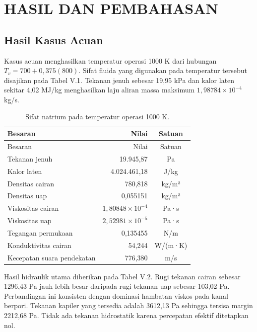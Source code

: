 \documentclass[
  12pt,a4paper,oneside]{report}
\begin{document}
\hypertarget{hasil-dan-pembahasan}{%
\chapter{HASIL DAN PEMBAHASAN}\label{hasil-dan-pembahasan}}

\hypertarget{hasil-kasus-acuan}{%
\section{Hasil Kasus Acuan}\label{hasil-kasus-acuan}}

Kasus acuan menghasilkan temperatur operasi 1000 K dari hubungan
\(T_v=700+0{,}375(800)\). Sifat fluida yang digunakan pada temperatur
tersebut disajikan pada Tabel V.1. Tekanan jenuh sebesar 19,95 kPa dan
kalor laten sekitar 4,02 MJ/kg menghasilkan laju aliran massa maksimum
\(1{,}98784\times10^{-4}\) kg/s.

\begin{longtable}[]{@{}lrc@{}}
\caption{Sifat natrium pada temperatur operasi 1000 K.}\tabularnewline
\toprule
Besaran & Nilai & Satuan \\
\midrule
\endfirsthead
\toprule
Besaran & Nilai & Satuan \\
\midrule
\endhead
Tekanan jenuh & 19.945,87 & Pa \\
Kalor laten & 4.024.461,18 & J/kg \\
Densitas cairan & 780,818 & kg/m³ \\
Densitas uap & 0,055151 & kg/m³ \\
Viskositas cairan & \(1{,}80848\times10^{-4}\) & Pa·s \\
Viskositas uap & \(2{,}52981\times10^{-5}\) & Pa·s \\
Tegangan permukaan & 0,135455 & N/m \\
Konduktivitas cairan & 54,244 & W/(m·K) \\
Kecepatan suara pendekatan & 776,380 & m/s \\
\bottomrule
\end{longtable}

Hasil hidraulik utama diberikan pada Tabel V.2. Rugi tekanan cairan
sebesar 1296,43 Pa jauh lebih besar daripada rugi tekanan uap sebesar
103,02 Pa. Perbandingan ini konsisten dengan dominasi hambatan viskos
pada kanal berpori. Tekanan kapiler yang tersedia adalah 3612,13 Pa
sehingga tersisa margin 2212,68 Pa. Tidak ada tekanan hidrostatik karena
percepatan efektif ditetapkan nol.
\end{document}
